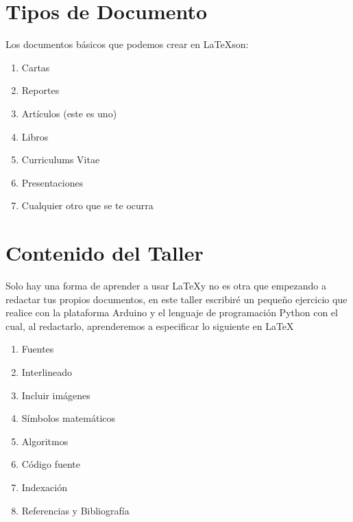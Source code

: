 \documentclass[10pt,a4paper,final,oneside,onecolumn,notitlepage]{article}
\begin{document}
\section{Tipos de Documento}{
Los documentos básicos que podemos crear en \LaTeX son:

\begin{enumerate}
	\item Cartas
	\item Reportes
	\item Artículos (este es uno)
	\item Libros
	\item Curriculums Vitae
	\item Presentaciones
	\item Cualquier otro que se te ocurra
\end{enumerate}
}

\section{Contenido del Taller}{
Solo hay una forma de aprender a usar \LaTeX y no es otra que empezando a redactar tus propios documentos, en este taller escribiré un pequeño ejercicio que realice con la plataforma Arduino y el lenguaje de programaci\'on Python con el cual, al redactarlo, aprenderemos a especificar lo siguiente en \LaTeX

\begin{enumerate}
	\item Fuentes
	\item Interlineado
	\item Incluir im\'agenes
	\item S\'imbolos matem\'aticos
	\item Algoritmos
	\item C\'odigo fuente
	\item Indexaci\'on
	\item Referencias y Bibliograf\'ia
\end{enumerate}
}
\end{document}
